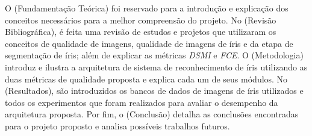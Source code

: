 \par O  (Fundamentação Teórica) foi reservado para a introdução e explicação dos conceitos necessários para a melhor compreensão do projeto. No  (Revisão Bibliográfica), é feita uma revisão de estudos e projetos que utilizaram os conceitos de qualidade de imagens, qualidade de imagens de íris e da etapa de segmentação de íris; além de explicar as métricas \textit{\acrshort{DSMI}} e \textit{\acrshort{FCE}}. O  (Metodologia) introduz e ilustra a arquitetura de sistema de reconhecimento de íris utilizando as duas métricas de qualidade proposta e explica cada um de seus módulos. No  (Resultados), são introduzidos os bancos de dados de imagens de íris utilizados e todos os experimentos que foram realizados para avaliar o desempenho da arquitetura proposta. Por fim, o  (Conclusão) detalha as conclusões encontradas para o projeto proposto e analisa possíveis trabalhos futuros.